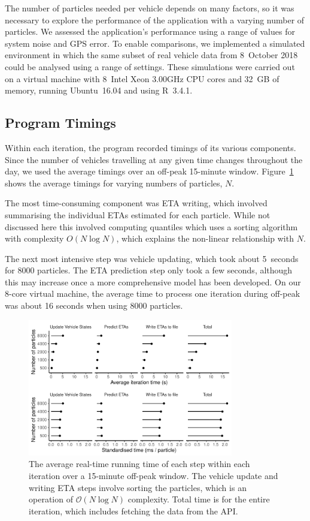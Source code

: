 The number of particles needed per vehicle 
depends on many factors,
so it was necessary to explore the performance of the application
with a varying number of particles.
We assessed the application's performance
using a range of values for
system noise and GPS error.
To enable comparisons, we implemented a simulated \rt environment
in which the same subset of real vehicle data from 8~October 2018
could be analysed using a range of settings.
These simulations were carried out on a virtual machine 
with 8~Intel Xeon 3.00GHz CPU cores and 32~GB of memory, 
running Ubuntu~16.04 and using R~3.4.1.


\subsection{Program Timings}
\label{sec:timings}

Within each iteration, the program recorded timings of its various components.
Since the number of vehicles travelling at any given time changes throughout the day,
we used the average timings over an off-peak 15-minute window.
Figure~\ref{fig:timings} shows the average timings for 
varying numbers of particles, $N$.


The most time-consuming component was ETA writing,
which involved summarising the individual ETAs estimated for each particle.
While not discussed here this involved computing quantiles which uses a sorting algorithm
with complexity $O(N \log N)$,
which explains the non-linear relationship with $N$.


The next most intensive step was vehicle updating,
which took about 5~seconds for 8000 particles.
The ETA prediction step only took a few seconds,
although this may increase once a more comprehensive model has been developed.
On our 8-core virtual machine, 
the average time to process one iteration during off-peak 
was about 16 seconds when using 8000 particles.

\begin{figure}[tb]
    \centering
    \includegraphics[width=0.8\textwidth]{figures/04_model_results_timing.pdf}
    \caption{
        The average real-time running time of each step within each iteration
        over a 15-minute off-peak window.
        The vehicle update and writing ETA steps involve sorting the particles,
        which is an operation of $\mathcal{O}(N\log N)$ complexity.
        Total time is for the entire iteration, which includes fetching the data from the API.
    }
    \label{fig:timings}
\end{figure}




